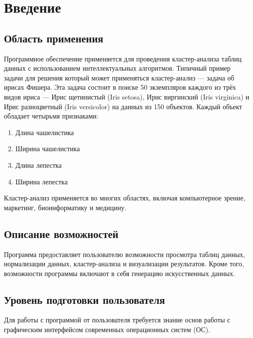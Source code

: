 \documentclass[12pt,tikz]{instruction}
\begin{document}
\tableofcontents 

\newpage
\section{Введение}
\subsection{Область применения} 

Программное обеспечение \SysName применяется для проведения кластер-анализа таблиц данных с использованием интеллектуальных алгоритмов. Типичный пример задачи для решения который может применяться кластер-анализ --- задача об ирисах Фишера. Эта задача состоит в поиске 50 экземпляров каждого из трёх видов ириса --- Ирис щетинистый (Iris setosa), Ирис виргинский (Iris virginica) и Ирис разноцветный (Iris versicolor) на данных из 150 объектов. Каждый объект обладает четырьмя признаками: 
\begin{enumerate}
	\item Длина чашелистика
	\item Ширина чашелистика
	\item Длина лепестка
	\item Ширина лепестка
\end{enumerate}
Кластер-анализ применяется во многих областях, включая компьютерное зрение, маркетинг, биоинформатику и медицину\cite{amorim}.


\subsection{Описание возможностей} 
Программа \SysName предоставляет пользователю возможности просмотра таблиц данных, нормализации данных, кластер-анализа и визуализации результатов. Кроме того, возможности программы включают в себя генерацию искусственных данных. 

\subsection{Уровень подготовки пользователя}
Для работы с программой от пользователя требуется знание основ работы с графическим интерфейсом современных операционных систем (ОС).
\end{document}
